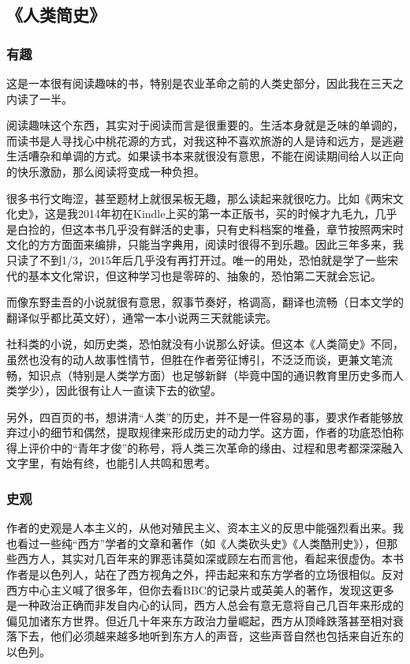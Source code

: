 \subsection{《人类简史》}

\subsubsection{有趣}

这是一本很有阅读趣味的书，特别是农业革命之前的人类史部分，因此我在三天之内读了一半。

阅读趣味这个东西，其实对于阅读而言是很重要的。生活本身就是乏味的单调的，而读书是人寻找心中桃花源的方式，对我这种不喜欢旅游的人是诗和远方，是逃避生活嘈杂和单调的方式。如果读书本来就很没有意思，不能在阅读期间给人以正向的快乐激励，那么阅读将变成一种负担。

很多书行文晦涩，甚至题材上就很呆板无趣，那么读起来就很吃力。比如《两宋文化史》，这是我2014年初在Kindle上买的第一本正版书，买的时候才九毛九，几乎是白捡的，但这本书几乎没有鲜活的史事，只有史料档案的堆叠，章节按照两宋时文化的方方面面来编排，只能当字典用，阅读时很得不到乐趣。因此三年多来，我只读了不到1/3，2015年后几乎没有再打开过。唯一的用处，恐怕就是学了一些宋代的基本文化常识，但这种学习也是零碎的、抽象的，恐怕第二天就会忘记。

而像东野圭吾的小说就很有意思，叙事节奏好，格调高，翻译也流畅（日本文学的翻译似乎都比英文好），通常一本小说两三天就能读完。

社科类的小说，如历史类，恐怕就没有小说那么好读。但这本《人类简史》不同，虽然也没有的动人故事性情节，但胜在作者旁征博引，不泛泛而谈，更兼文笔流畅，知识点（特别是人类学方面）也足够新鲜（毕竟中国的通识教育里历史多而人类学少），因此很有让人一直读下去的欲望。

另外，四百页的书，想讲清“人类”的历史，并不是一件容易的事，要求作者能够放弃过小的细节和偶然，提取规律来形成历史的动力学。这方面，作者的功底恐怕称得上评价中的“青年才俊”的称号，将人类三次革命的缘由、过程和思考都深深融入文字里，有始有终，也能引人共鸣和思考。

\subsubsection{史观}
作者的史观是人本主义的，从他对殖民主义、资本主义的反思中能强烈看出来。我也看过一些纯“西方”学者的文章和著作（如《人类砍头史》《人类酷刑史》），但那些西方人，其实对几百年来的罪恶讳莫如深或顾左右而言他，看起来很虚伪。本书作者是以色列人，站在了西方视角之外，抨击起来和东方学者的立场很相似。反对西方中心主义喊了很多年，但你去看BBC的记录片或英美人的著作，发现这更多是一种政治正确而非发自内心的认同，西方人总会有意无意将自己几百年来形成的偏见加诸东方世界。但近几十年来东方政治力量崛起，西方从顶峰跌落甚至相对衰落下去，他们必须越来越多地听到东方人的声音，这些声音自然也包括来自近东的以色列。

